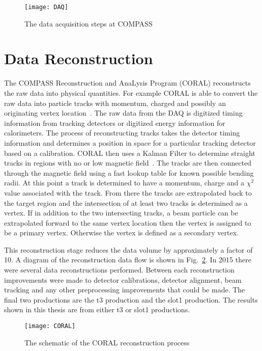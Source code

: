 \begin{figure}[h!t]
  \centering
  \texttt{[image: DAQ]}
  \caption{The data acquisition steps at COMPASS}
  \label{fig::DAQ}
\end{figure}


\section{Data Reconstruction}
The COMPASS Reconstruction and AnaLysis Program (CORAL) reconstructs the raw
data into physical quantities.  For example CORAL is able to convert the raw
data into particle tracks with momentum, charged and possibly an originating
vertex location~\cite{CORAL}.  The raw data from the DAQ is digitized timing
information from tracking detectors or digitized energy information for
calorimeters.  The process of reconstructing tracks takes the detector timing
information and determines a position in space for a particular tracking
detector based on a calibration.  CORAL then uses a Kalman Filter to determine
straight tracks in regions with no or low magnetic field~\cite{KalmanFilter}.
The tracks are then connected through the magnetic field using a fast lookup
table for known possible bending radii.  At this point a track is determined to
have a momentum, charge and a $\chi^2$ value associated with the track.  From
there the tracks are extrapolated back to the target region and the intersection
of at least two tracks is determined as a vertex.  If in addition to the two
intersecting tracks, a beam particle can be extrapolated forward to the same
vertex location then the vertex is assigned to be a primary vertex.  Otherwise
the vertex is defined as a secondary vertex.

This reconstruction stage reduces the data volume by approximately a factor of
10.  A diagram of the reconstruction data flow is shown in
Fig.~\ref{fig::CORAL}.  In 2015 there were several data reconstructions
performed.  Between each reconstruction improvements were made to detector
calibrations, detector alignment, beam tracking and any other preprocessing
improvements that could be made.  The final two productions are the t3
production and the slot1 production.  The results shown in this thesis are from
either t3 or slot1 productions.\par

\begin{figure}[h!t]
  \centering
  \texttt{[image: CORAL]}
  \caption{The schematic of the CORAL reconstruction process}
  \label{fig::CORAL}
\end{figure}

